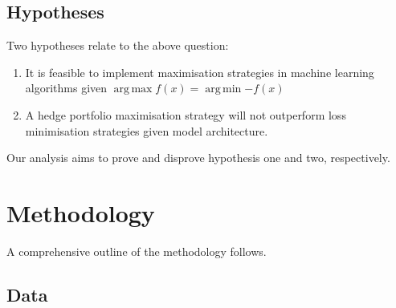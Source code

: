 \documentclass[12pt]{article}
\DeclareMathOperator*{\argmax}{arg\,max}
\DeclareMathOperator*{\argmin}{arg\,min} %
\begin{document}
\subsection{Hypotheses}
Two hypotheses relate to the above question:
\singlespacing
\begin{enumerate}
	\item It is feasible to implement maximisation strategies in machine learning algorithms given $\argmax{f(x)}=\argmin{-f(x)}$
	\item A hedge portfolio maximisation strategy will not outperform loss minimisation strategies given model architecture.
\end{enumerate}
\doublespacing
Our analysis aims to prove and disprove hypothesis one and two, respectively.
\newpage
\section{Methodology}
A comprehensive outline of the methodology follows.
\subsection{Data}\label{data}
\end{document}
